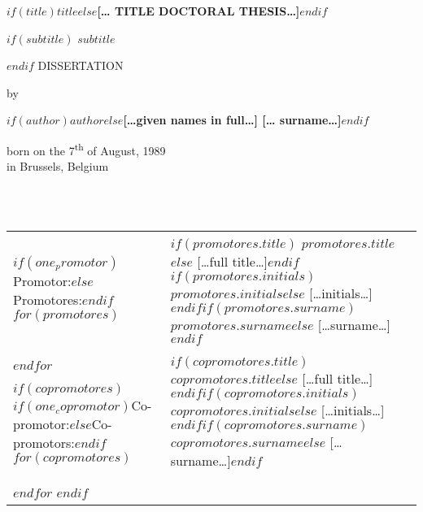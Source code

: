 \documentclass[$if(fontsize)$$fontsize$,$endif$$if(papersize)$$papersize$paper,twoside,$endif$$for(classoption)$$classoption$$sep$,$endfor$]{$documentclass$} %
\begin{document}
\clearpage
\thispagestyle{empty}
\vspace*{\drop}
\begin{center}
\huge\textbf{\uppercase{$if(title)$$title$$else$[… Title Doctoral Thesis…]$endif$}}\par
$if(subtitle)$
\medskip
\Large\uppercase{$subtitle$}\par
$endif$
\vfill %
\large \uppercase{dissertation}\par
\vspace{\baselineskip}
\par %
\vspace*{2cm}
{\normalsize by}\par
\medskip
{\normalsize\textbf{$if(author)$$author$$else$[…given names in full…] [… surname…]$endif$}}\par
\medskip
\normalsize born on the 7\textsuperscript{th} of August, 1989\\
in Brussels, Belgium
\end{center}

\clearpage\shipout\null

\clearpage
\thispagestyle{empty}
\noindent{}\\
\\
\noindent\begin{tabular}{@{}lll}

$if(one_promotor)$Promotor:$else$Promotores:$endif$
$for(promotores)$
& $if(promotores.title)$ $promotores.title$$else$ […full title…]$endif$$if(promotores.initials)$ $promotores.initials$$else$ […initials…]$endif$$if(promotores.surname)$ $promotores.surname$$else$ […surname…]$endif$\\
$endfor$

$if(copromotores)$
$if(one_copromotor)$Co-promotor:$else$Co-promotors:$endif$
$for(copromotores)$
& $if(copromotores.title)$ $copromotores.title$$else$ […full title…]$endif$$if(copromotores.initials)$ $copromotores.initials$$else$ […initials…]$endif$$if(copromotores.surname)$ $copromotores.surname$$else$ […surname…]$endif$\\
$endfor$
$endif$
\end{tabular}\\
\end{document}
